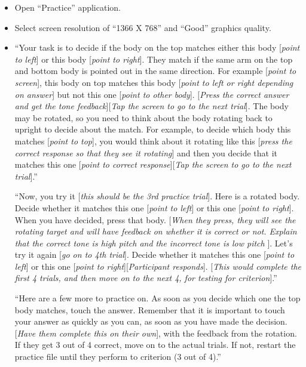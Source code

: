 \documentclass{article}
\begin{document}
\begin{itemize}

\item Open ``Practice'' application.

\item Select screen resolution of ``1366 X 768'' and ``Good'' graphics quality.

\item ``Your task is to decide if the body on the top matches either this body [\emph{point to left}] or this body [\emph{point to right}]. They match if the same arm on the top and bottom body is pointed out in the same direction. For example [\emph{point to screen}], this body on top matches this body [\emph{point to left or right depending on answer}] but not this one [\emph{point to other body}].  [\emph{Press the correct answer and get the tone feedback}][\emph{Tap the screen to go to the next trial}]. The body may be rotated, so you need to think about the body rotating back to upright to decide about the match. For example, to decide which body this matches [\emph{point to top}], you would think about it rotating like this [\emph{press the correct response so that they see it rotating}] and then you decide that it matches this one [\emph{point to correct response}][\emph{Tap the screen to go to the next trial}].''

``Now, you try it [\emph{this should be the 3rd practice trial}]. Here is a rotated body. Decide whether it matches this one [\emph{point to left}] or this one [\emph{point to right}]. When you have decided, press that body. [\emph{When they press, they will see the rotating target and will have feedback on whether it is correct or not. Explain that the correct tone is high pitch and the incorrect tone is low pitch }]. Let’s try it again [\emph{go on to 4th trial}]. Decide whether it matches this one [\emph{point to left}] or this one [\emph{point to right}][\emph{Participant responds}]. [\emph{This would complete the first 4 trials, and then move on to the next 4, for testing for criterion}].''

``Here are a few more to practice on. As soon as you decide which one the top body matches, touch the answer. Remember that it is important to touch your answer as quickly as you can, as soon as you have made the decision. [\emph{Have them complete this on their own}], with the feedback from the rotation. If they get 3 out of 4 correct, move on to the actual trials. If not, restart the practice file until they perform to criterion (3 out of 4).''


\end{itemize}
\end{document}
